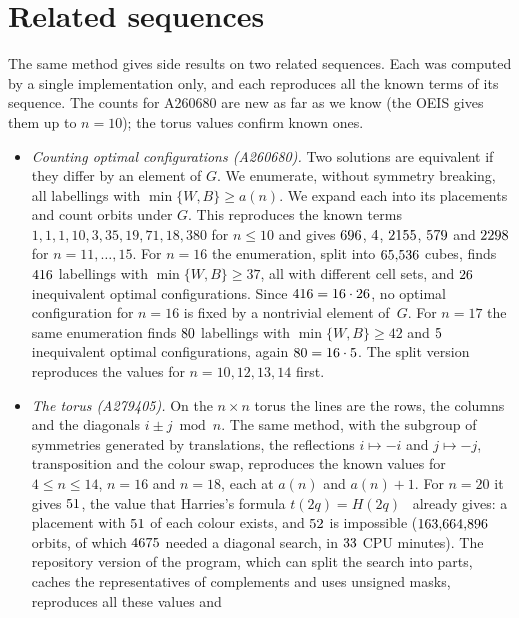 \documentclass[11pt]{article}
\theoremstyle{remark}
\begin{document}
\section{Related sequences}\label{sec:related}

The same method gives side results on two related sequences. Each was computed by a single
implementation only, and each reproduces all the known terms of its sequence. The counts for A260680 are
new as far as we know (the OEIS gives them up to $n=10$); the torus values confirm known ones.
\begin{itemize}
\item \emph{Counting optimal configurations (A260680).} Two solutions are equivalent if they differ by an
element of $G$. We enumerate, without symmetry breaking, all labellings with $\min\{W,B\}\ge a(n)$. We
expand each into its placements and count orbits under $G$. This reproduces the known terms
$1,1,1,10,3,35,19,71,18,380$ for $n\le10$ and gives $696$, $4$, $2155$,
$579$ and $2298$ for $n=11,\dots,15$. For $n=16$ the enumeration, split into
$65{,}536$ cubes, finds $416$ labellings with $\min\{W,B\}\ge37$, all with
different cell sets, and $26$ inequivalent optimal configurations. Since
$416=16\cdot26$, no optimal configuration for $n=16$ is fixed by a nontrivial
element of~$G$. For $n=17$ the same enumeration finds $80$ labellings with
$\min\{W,B\}\ge42$ and $5$ inequivalent optimal configurations, again
$80=16\cdot5$. The split version reproduces the values for $n=10,12,13,14$
first.
\item \emph{The torus (A279405).} On the $n\times n$ torus the lines are the rows, the columns and the
diagonals $i\pm j\bmod n$. The same method, with the subgroup of symmetries generated by translations,
the reflections $i\mapsto-i$ and $j\mapsto-j$, transposition and the colour swap, reproduces the known
values for $4\le n\le14$, $n=16$ and $n=18$, each at $a(n)$ and $a(n)+1$. For $n=20$ it gives $51$, the value that Harries's formula $t(2q)=H(2q)$~\cite[Cor.~4]{Harries}
already gives: a placement with
$51$ of each colour exists, and $52$ is impossible ($163{,}664{,}896$ orbits, of
which $4675$ needed a diagonal search, in $33$ CPU minutes). The repository version of the program, which can split the search into
parts, caches the representatives of complements and uses unsigned masks, reproduces all these values and

\end{itemize}
\end{document}
